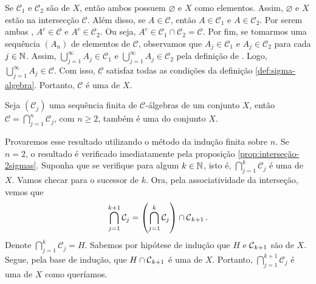 \begin{prova}
    Se $\mathcal{C}_1$ e $\mathcal{C}_2$ são \sigals de $X$, então ambos possuem $\varnothing$ e $X$ como elementos.
    Assim, $\varnothing$ e $X$ estão na intersecção $\mathcal{C}$.
    Além disso, se $A \in \mathcal{C}$, então $A \in \mathcal{C}_1$ e $A \in \mathcal{C}_2$. 
    Por serem ambas \sigals, $A^c \in \mathcal{C}$ e $A^c \in \mathcal{C}_2$.
    Ou seja, $A^c \in \mathcal{C}_1 \cap \mathcal{C}_2 = \mathcal{C}$.
    Por fim, se tomarmos uma sequência $(A_n)$ de elementos de $\mathcal{C}$, observamos que $A_j \in \mathcal{C}_1$ e $A_j \in \mathcal{C}_2$ para cada $j \in \operatorname{\mathbb{N}}$.
    Assim, $\displaystyle \bigcup_{j = 1}^\infty A_j \in \mathcal{C}_1$ e 
    $\displaystyle \bigcup_{j = 1}^\infty A_j \in \mathcal{C}_2$ pela definição de \sigal.
    Logo, $\displaystyle \bigcup_{j = 1}^\infty A_j \in \mathcal{C}$.
    Com isso, $\mathcal{C}$ satisfaz todas as condições da definição \ref{def:sigma-algebra}. 
    Portanto, $\mathcal{C}$ é uma \sigal de $X$.
\end{prova}

\begin{proposition}
\label{prop:interseção-sigmas}
    Seja $(\mathcal{C}_j)$ uma sequência finita de $\mathcal{C}$-álgebras de um conjunto $X$, então 
    $\mathcal{C} = \displaystyle \bigcap_{j =1}^n\mathcal{C}_j$, com $n \geq 2$, também é uma \sigal do conjunto $X$.
    
\end{proposition}
\begin{prova}
    Provaremos esse resultado utilizando o método da indução finita sobre $n$.
    Se $n = 2$, o resultado é verificado imediatamente pela proposição \ref{prop:interseção-2sigmas}.
    Suponha que se verifique para algum $k \in \operatorname{\mathbb{N}}$, isto é, $\displaystyle \bigcap_{j =1}^k\mathcal{C}_j$ é uma \sigal de $X$.
    Vamos checar para o sucessor de $k$.
    Ora, pela associatividade da interseção, vemos que 
    \begin{align*}
        \displaystyle \bigcap_{j =1}^{k+1}\mathcal{C}_j = \left(\displaystyle \bigcap_{j =1}^k\mathcal{C}_j\right) \cap \operatorname{\mathcal{C}}_{k+1}.
  	\end{align*}
	Denote $\displaystyle \bigcap_{j =1}^k\mathcal{C}_j = H$. 
	Sabemos por hipótese de indução que $H$  e $\operatorname{\mathcal{C}}_{k+1}$ são  \sigals de $X$. 
	Segue, pela base de indução, que $H \cap \operatorname{\mathcal{C}}_{k+1}$ é uma \sigal de $X$.
	Portanto, $\displaystyle \bigcap_{j =1}^{k+1}\mathcal{C}_j$ é uma \sigal de $X$ como queríamos.
\end{prova}

